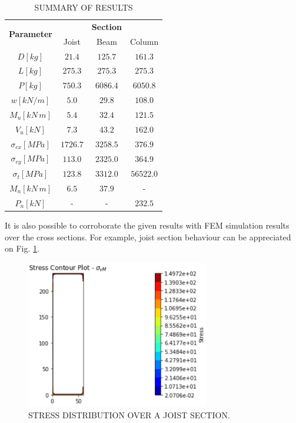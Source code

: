 \documentclass[twocolumn,10pt]{asme2e}
\begin{document}
\begin{table}[t]
\centering
\caption{SUMMARY OF RESULTS}
\vspace{0.5cm}
\begin{tabular}{c | c c c}
\hline
\multirow{2}{*}{\textbf{Parameter}} & & \textbf{Section} \\  \cline{2-4}
 & Joist & Beam & Column \\ \hline
$D [kg]$  & $21.4$ & $125.7$ & $161.3$ \\ \hline
$L [kg]$ & $275.3$ & $275.3$ & $275.3$ \\ \hline
$P [kg]$ & $750.3$ & $6086.4$ & $6050.8$ \\ \hline
$w [kN/m]$ & $5.0$ & $29.8$ & $108.0$ \\ \hline
$M_u [kN \, m]$ & $5.4$ & $32.4$ & $121.5$ \\ \hline
$V_u [kN]$ & $7.3$ & $43.2$ & $162.0$ \\ \hline
$\sigma _{ex} [MPa]$ & $1726.7$ & $3258.5$ & $376.9$ \\ \hline
$\sigma _{ey} [MPa]$ & $113.0$ & $2325.0$ & $364.9$ \\ \hline
$\sigma _{t} [MPa]$ & $123.8$ & $3312.0$ & $56522.0$ \\ \hline
$M _{n} [kN \, m]$ & $6.5$ & $37.9$ & - \\ \hline
$P_{n} [kN]$ & - & - & $232.5$ \\ \hline

\end{tabular}
\label{loads}
\end{table}

It is also possible to corroborate the given results with FEM simulation results over the cross sections. For example, joist section behaviour can be appreciated on Fig. \ref{stress}.

\begin{figure}[t]
\centering
\includegraphics[width=8cm]{Images/vmJoist.PNG}
\caption{STRESS DISTRIBUTION OVER A JOIST SECTION.}
\label{stress}
\end{figure} 
\end{document}

